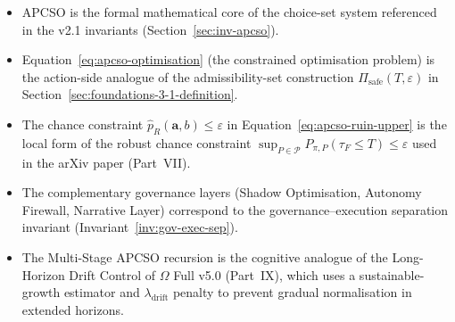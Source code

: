 \begin{itemize}
\item APCSO is the formal mathematical core of the choice-set system
referenced in the v2.1 invariants
(Section~\ref{sec:inv-apcso}).
\item Equation~\ref{eq:apcso-optimisation} (the constrained
optimisation problem) is the action-side analogue of the
admissibility-set construction
$\Pi_{\mathrm{safe}}(T, \varepsilon)$ in
Section~\ref{sec:foundations-3-1-definition}.
\item The chance constraint
$\widehat{p}_R(\mathbf{a}, b) \le \varepsilon$ in
Equation~\ref{eq:apcso-ruin-upper} is the local form of the
robust chance constraint $\sup_{P \in \mathcal{P}}
P_{\pi, P}(\tau_F \le T) \le \varepsilon$ used in the arXiv paper
(Part~VII).
\item The complementary governance layers (Shadow Optimisation,
Autonomy Firewall, Narrative Layer) correspond to the
governance--execution separation invariant
(Invariant~\ref{inv:gov-exec-sep}).
\item The Multi-Stage APCSO recursion is the cognitive analogue of
the Long-Horizon Drift Control of $\Omega$ Full v5.0 (Part~IX),
which uses a sustainable-growth estimator and
$\lambda_{\mathrm{drift}}$ penalty to prevent gradual normalisation
in extended horizons.
\end{itemize}
